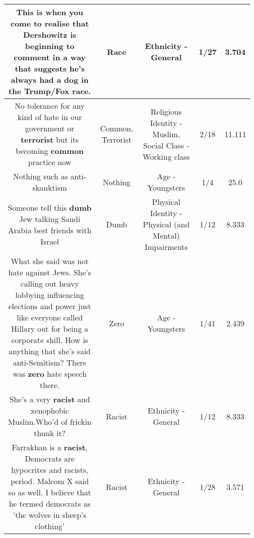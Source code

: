 \documentclass[11pt]{article}
\newlength\mylength
\begin{document}
\begin{center}
\begin{longtable}{|C{.65\mylength}|C{.30\mylength}|C{.12\mylength}|C{.12\mylength}|C{.12\mylength}|}
  \small This is when you come to realise that Dershowitz is beginning to comment in a way that suggests he's always had a dog in the Trump/Fox \textbf{race}.\normalsize   & Race & Ethnicity - General & 1/27 & 3.704 \\  \hline
  \small No tolerance for any kind of hate in our government or \textbf{terrorist} but its becoming \textbf{common} practice now\normalsize   & Common, Terrorist & Religious Identity - Muslim, Social Class - Working class & 2/18 & 11.111 \\  \hline
  \small Nothing such as anti-skanktism\normalsize   & Nothing & Age - Youngsters & 1/4 & 25.0 \\  \hline
  \small Someone tell this \textbf{dumb} Jew talking Saudi Arabia best friends with Israel\normalsize   & Dumb & Physical Identity - Physical (and Mental) Impairments & 1/12 & 8.333 \\  \hline
  \small What she said was not hate against Jews. She's calling out heavy lobbying influencing elections and power just like everyone called Hillary out for being a corporate shill. How is anything that she's said anti-Semitism? There was \textbf{zero} hate speech there.\normalsize   & Zero & Age - Youngsters & 1/41 & 2.439 \\  \hline
  \small She's a very \textbf{racist} and xenophobic Muslim.Who'd of frickin thunk it?\normalsize   & Racist & Ethnicity - General & 1/12 & 8.333 \\  \hline
  \small Farrakhan is a \textbf{racist}, Democrats are hypocrites and racists, period. Malcom X said so as well.  I believe that he termed democrats as 'the wolves in sheep's clothing'\normalsize   & Racist & Ethnicity - General & 1/28 & 3.571 \\  \hline

\end{longtable}
\end{center}
\end{document}
